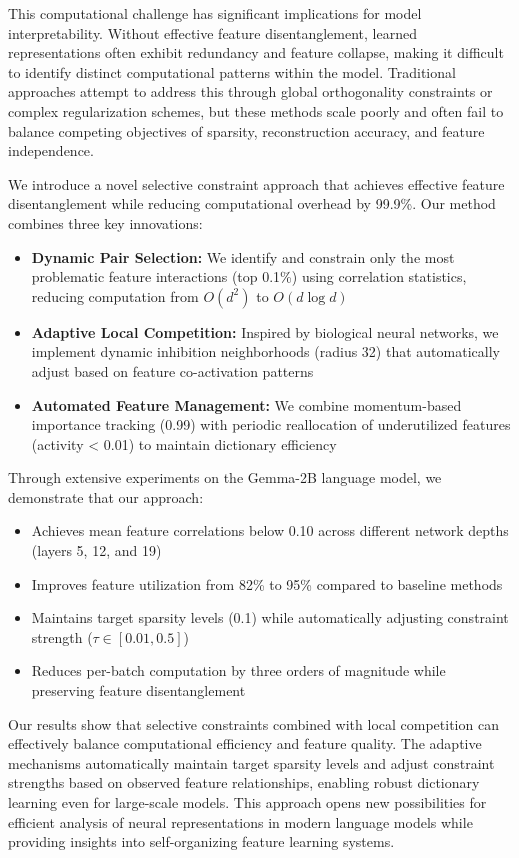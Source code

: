 \documentclass{article} %
\begin{document}
This computational challenge has significant implications for model interpretability. Without effective feature disentanglement, learned representations often exhibit redundancy and feature collapse, making it difficult to identify distinct computational patterns within the model. Traditional approaches attempt to address this through global orthogonality constraints or complex regularization schemes, but these methods scale poorly and often fail to balance competing objectives of sparsity, reconstruction accuracy, and feature independence.

We introduce a novel selective constraint approach that achieves effective feature disentanglement while reducing computational overhead by 99.9\%. Our method combines three key innovations:

\begin{itemize}
    \item \textbf{Dynamic Pair Selection:} We identify and constrain only the most problematic feature interactions (top 0.1\%) using correlation statistics, reducing computation from $O(d^2)$ to $O(d \log d)$
    \item \textbf{Adaptive Local Competition:} Inspired by biological neural networks, we implement dynamic inhibition neighborhoods (radius 32) that automatically adjust based on feature co-activation patterns
    \item \textbf{Automated Feature Management:} We combine momentum-based importance tracking (0.99) with periodic reallocation of underutilized features (activity < 0.01) to maintain dictionary efficiency
\end{itemize}

Through extensive experiments on the Gemma-2B language model, we demonstrate that our approach:
\begin{itemize}
    \item Achieves mean feature correlations below 0.10 across different network depths (layers 5, 12, and 19)
    \item Improves feature utilization from 82\% to 95\% compared to baseline methods
    \item Maintains target sparsity levels (0.1) while automatically adjusting constraint strength ($\tau \in [0.01, 0.5]$)
    \item Reduces per-batch computation by three orders of magnitude while preserving feature disentanglement
\end{itemize}

Our results show that selective constraints combined with local competition can effectively balance computational efficiency and feature quality. The adaptive mechanisms automatically maintain target sparsity levels and adjust constraint strengths based on observed feature relationships, enabling robust dictionary learning even for large-scale models. This approach opens new possibilities for efficient analysis of neural representations in modern language models while providing insights into self-organizing feature learning systems.
\end{document}
